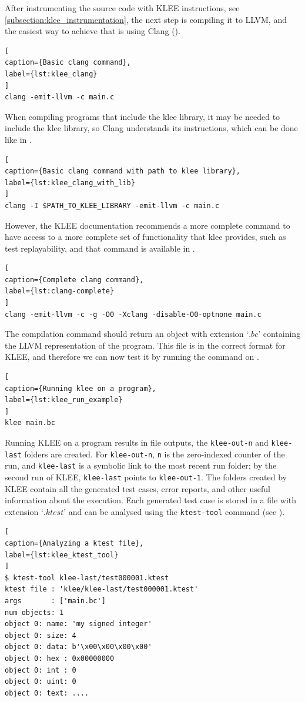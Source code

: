After instrumenting the source code with KLEE instructions, see \cref{subsection:klee_instrumentation}, the next step is compiling it to LLVM, and the easiest way to achieve that is using Clang ().

\begin{lstlisting}[
caption={Basic clang command},
label={lst:klee_clang}
]
clang -emit-llvm -c main.c
\end{lstlisting}

When compiling programs that include the klee library, it may be needed to include the klee library, so Clang understands its instructions, which can be done like in .

\begin{lstlisting}[
caption={Basic clang command with path to klee library},
label={lst:klee_clang_with_lib}
]
clang -I $PATH_TO_KLEE_LIBRARY -emit-llvm -c main.c
\end{lstlisting}

However, the KLEE documentation recommends a more complete command to have access to a more complete set of functionality that klee provides, such as test replayability, and that command is available in .

\begin{lstlisting}[
caption={Complete clang command},
label={lst:clang-complete}
]
clang -emit-llvm -c -g -O0 -Xclang -disable-O0-optnone main.c
\end{lstlisting}

The compilation command should return an object with extension `$.bc$' containing the LLVM representation of the program. This file is in the correct format for KLEE, and therefore we can now test it by running the command on .

\begin{lstlisting}[
caption={Running klee on a program},
label={lst:klee_run_example}
]
klee main.bc
\end{lstlisting}

Running KLEE on a program results in file outputs, the \lstinline$klee-out-n$ and \lstinline$klee-last$ folders are created. For \lstinline$klee-out-n$, \lstinline$n$ is the zero-indexed counter of the run, and \lstinline$klee-last$ is a symbolic link to the most recent run folder; by the second run of KLEE, \lstinline$klee-last$ points to \lstinline$klee-out-1$. The folders created by KLEE contain all the generated test cases, error reports, and other useful information about the execution. Each generated test case is stored in a file with extension `$.ktest$' and can be analysed using the \lstinline$ktest-tool$ command (see ).

\begin{lstlisting}[
caption={Analyzing a ktest file},
label={lst:klee_ktest_tool}
]
$ ktest-tool klee-last/test000001.ktest
ktest file : 'klee/klee-last/test000001.ktest'
args       : ['main.bc']
num objects: 1
object 0: name: 'my signed integer'
object 0: size: 4
object 0: data: b'\x00\x00\x00\x00'
object 0: hex : 0x00000000
object 0: int : 0
object 0: uint: 0
object 0: text: ....
\end{lstlisting}
